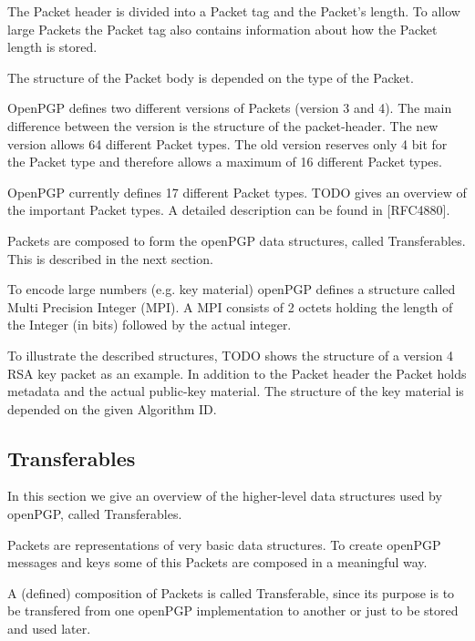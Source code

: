 The Packet header is divided into a Packet tag and the Packet's length. To allow large Packets the Packet tag also contains information about how the Packet length is stored. 

The structure of the Packet body is depended on the type of the Packet.


OpenPGP defines two different versions of Packets (version 3 and 4). The main difference between the version is the structure of the packet-header. The new version allows 64 different Packet types. The old version reserves only 4 bit for the Packet type and therefore allows a maximum of 16 different Packet types.

OpenPGP currently defines 17 different Packet types. TODO gives an overview of the important Packet types. A detailed description can be found in [RFC4880]. 

Packets are composed to form the openPGP data structures, called Transferables. This is described in the next section.



To encode large numbers (e.g. key material) openPGP defines a structure called Multi Precision Integer (MPI). A MPI consists of 2 octets holding the length of the Integer (in bits) followed by the actual integer.


To illustrate the described structures, TODO shows the structure of a version 4 RSA key packet as an example. In addition to the Packet header the Packet holds metadata and the actual public-key material. The structure of the key material is depended on the given Algorithm ID.



\subsection{Transferables}

In this section we give an overview of the higher-level data structures used by openPGP, called Transferables. 

Packets are representations of very basic data structures. To create openPGP messages and keys some of this Packets are composed in a meaningful way.

A (defined) composition of Packets is called Transferable, since its purpose is to be transfered from one openPGP implementation to another or just to be stored and used later.

